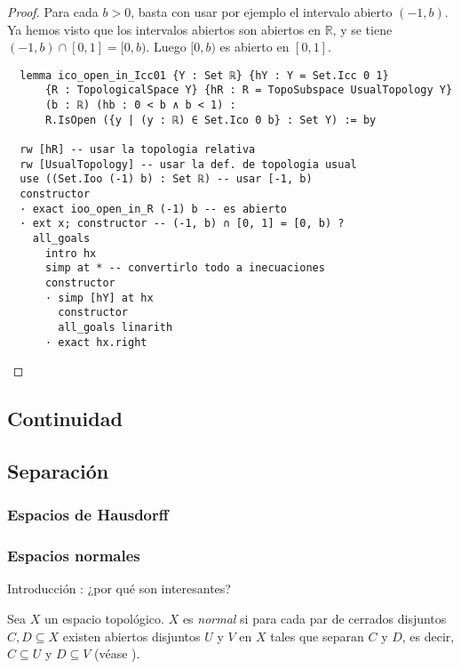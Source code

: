 \begin{proof}
  Para cada $b > 0$, basta con usar por ejemplo el intervalo abierto $(-1, b)$. Ya hemos visto que los intervalos abiertos son abiertos en $\mathbb{R}$, y se tiene $(-1, b) \cap [0, 1] = [0, b)$. Luego $[0, b)$ es abierto en $[0, 1]$.

  \begin{lstlisting}
  lemma ico_open_in_Icc01 {Y : Set ℝ} {hY : Y = Set.Icc 0 1}
      {R : TopologicalSpace Y} {hR : R = TopoSubspace UsualTopology Y}
      (b : ℝ) (hb : 0 < b ∧ b < 1) :
      R.IsOpen ({y | (y : ℝ) ∈ Set.Ico 0 b} : Set Y) := by

  rw [hR] -- usar la topologia relativa
  rw [UsualTopology] -- usar la def. de topologia usual
  use ((Set.Ioo (-1) b) : Set ℝ) -- usar [-1, b)
  constructor
  · exact ioo_open_in_R (-1) b -- es abierto
  · ext x; constructor -- (-1, b) ∩ [0, 1] = [0, b) ?
    all_goals
      intro hx
      simp at * -- convertirlo todo a inecuaciones
      constructor
      · simp [hY] at hx
        constructor
        all_goals linarith
      · exact hx.right \end{lstlisting}
\end{proof}


\subsection{Continuidad}





\subsection{Separación}



\subsubsection{Espacios de Hausdorff}

\newpage
\subsubsection{Espacios normales}

Introducción : ¿por qué son interesantes?

\begin{definition}
  Sea $X$ un espacio topológico. $X$ es \emph{normal} si para cada par de cerrados disjuntos $C, D \subseteq X$ existen abiertos disjuntos $U$ y $V$ en $X$ tales  que separan $C$ y $D$, es decir, $C \subseteq U$ y $D \subseteq V$ \textnormal{(véase \cite[p. 99]{willard2012general})}.
\end{definition}

